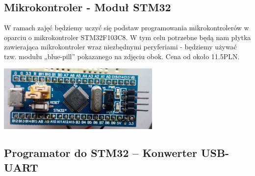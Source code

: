 % 
% 
% 
% 

\subsection{Mikrokontroler - Moduł STM32}

\parbox[c]{0.55\textwidth}{
	W ramach zajęć będziemy uczyć się podstaw programowania mikrokontrolerów w oparciu o mikrokontroler STM32F103C8.
	W tym celu potrzebne będą nam płytka zawierająca mikrokontroler wraz niezbędnymi peryferiami - będziemy używać tzw. modułu „blue-pill” pokazanego na zdjęciu obok. Cena od około 11.5PLN.
}
\parbox[c]{0.43\textwidth}{
	\begin{flushright} \includegraphics[height=3.3cm]{warsztat_elektroniczny/blue-pill} \end{flushright}
}


\subsection{Programator do STM32 – Konwerter USB-UART}

